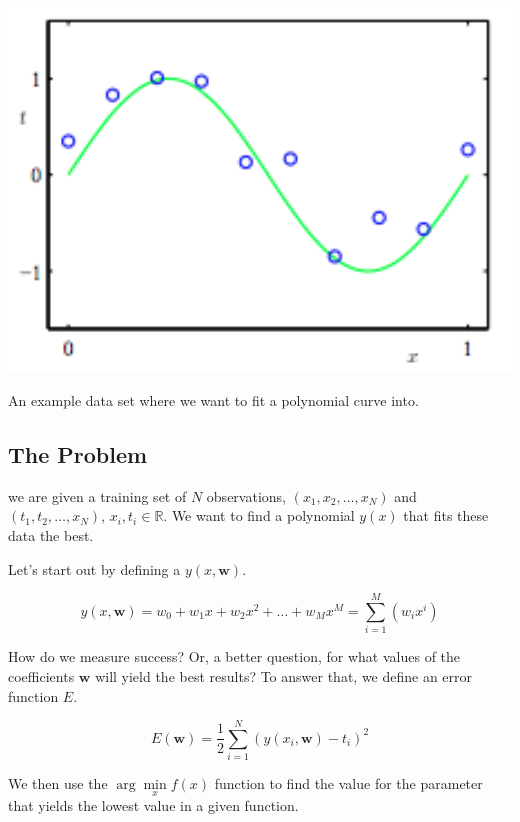 \documentclass{tufte-handout}
\begin{document}
\begin{marginfigure}
  \includegraphics[width=\linewidth]{curvefitting.png}
  \caption{An example data set where we want to fit a polynomial curve into.}
\end{marginfigure}

\subsection{The Problem}\label{sec:headings}

 we are given a training set of $N$ observations, $(x_{1},
x_{2}, \ldots, x_{N})$ and $(t_{1}, t_{2}, \ldots, x_{N})$, $x_{i}, t_{i} \in
\mathbb{R}$. We want to find a polynomial $y(x)$ that fits these data the best.

Let's start out by defining a $y(x, \mathbf{w})$.

\begin{equation}
  y(x, \mathbf{w}) = w_0 + w_1x + w_2x^2 + \ldots + w_Mx^M =
  \sum\limits_{i = 1}^M(w_ix^i)
\end{equation}

How do we measure success? Or, a better question, for what values of the
coefficients $\mathbf{w}$ will yield the best results? To answer that, we define
an error function $E$.

\begin{equation}
  E(\mathbf{w}) = \frac{1}{2}\sum\limits_{i = 1}^N(y(x_i, \mathbf{w}) - t_i)^2
\end{equation}

We then use the $\arg\min\limits_{x}f(x)$ function to find the value for the
parameter that yields the lowest value in a given function.
\end{document}
